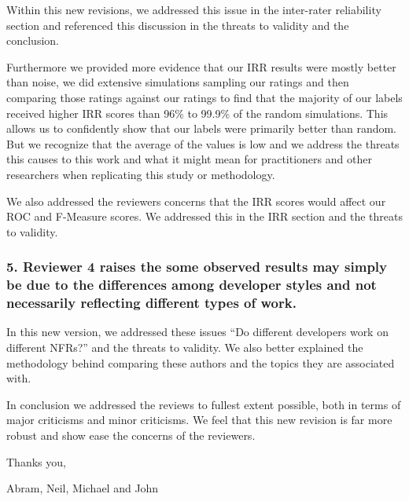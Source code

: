 \documentclass{article}
\begin{document}
Within this new revisions, we addressed this issue in the inter-rater
reliability section and referenced this discussion in the threats to
validity and the conclusion. 

Furthermore we provided more evidence that our IRR results were mostly
better than noise, we did extensive simulations sampling our ratings
and then comparing those ratings against our ratings to find that the
majority of our labels received higher IRR scores than 96\% to 99.9\%
of the random simulations. This allows us to confidently show that our
labels were primarily better than random. But we recognize that the
average of the values is low and we address the threats this causes to
this work and what it might mean for practitioners and other
researchers when replicating this study or methodology.

We also addressed the reviewers concerns that the IRR scores would
affect our ROC and F-Measure scores. We addressed this in the IRR
section and the threats to validity.

\subsubsection*{5. Reviewer 4 raises the some observed results may simply be due to
 the differences among developer styles and not necessarily
 reflecting different types of work. }

In this new version, we addressed these issues ``Do different
developers work on different NFRs?''  and the threats to validity. We
also better explained the methodology behind comparing these authors
and the topics they are associated with.

In conclusion we addressed the reviews to fullest extent possible,
both in terms of major criticisms and minor criticisms. We feel that
this new revision is far more robust and show ease the concerns of the
reviewers.

Thanks you,

Abram, Neil, Michael and John
\end{document}
